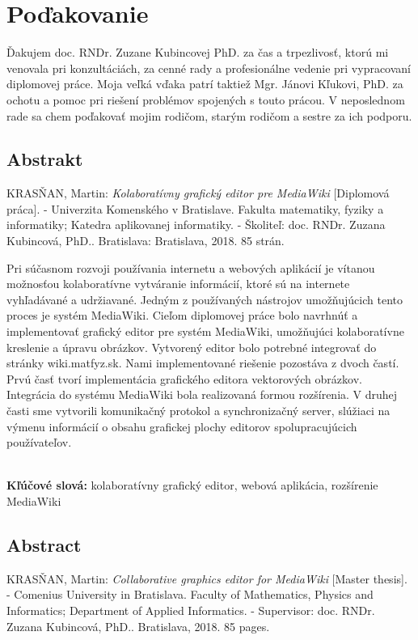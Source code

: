 \documentclass[12pt, a4paper, oneside]{book}
\newcommand\mftitle{Kolaboratívny grafický editor pre MediaWiki}
\newcommand\enmftitle{Collaborative graphics editor for MediaWiki}
\newcommand\mfthesistype{Diplomová práca}
\newcommand\enmfthesistype{Master thesis}
\newcommand\mfadvisor{doc. RNDr. Zuzana Kubincová, PhD.}
\newcommand\mfplacedate{Bratislava, 2018}
\newcommand\mfpracovisko{Katedra aplikovanej informatiky}
\newcommand\enmfpracovisko{Department of Applied Informatics}
\begin{document}
\chapter*{Poďakovanie}\label{chap:thank_you}
Ďakujem doc. RNDr. Zuzane Kubincovej PhD. za čas a trpezlivosť, ktorú mi venovala pri konzultáciách, za cenné rady a profesionálne vedenie pri vypracovaní diplomovej práce. Moja veľká vďaka patrí taktiež Mgr. Jánovi Kľukovi, PhD. za ochotu a pomoc pri riešení problémov spojených s touto prácou. V neposlednom rade sa chem poďakovať mojim rodičom, starým rodičom a sestre za ich podporu. 
\vfill\eject 

\def\spaceafterpar{1em}
\setlength{\parskip}{\spaceafterpar}
\setlength\parindent{0pt}

\section*{Abstrakt}\label{chap:abstract_sk}
\MakeUppercase{Krasňan}, Martin: \textit{\mftitle} [\mfthesistype]. - Univerzita Komenského v Bratislave. Fakulta matematiky, fyziky a informatiky; \mfpracovisko. - Školiteľ: \mfadvisor. Bratislava: \mfplacedate. 85 strán.

Pri súčasnom rozvoji používania internetu a webových aplikácií je vítanou možnosťou kolaboratívne vytváranie informácií, ktoré sú na internete vyhľadávané a udržiavané. Jedným z používaných nástrojov umožňujúcich tento proces je systém MediaWiki.
Cieľom diplomovej práce bolo navrhnúť a implementovať grafický editor pre systém MediaWiki, umožňujúci kolaboratívne kreslenie a úpravu obrázkov. Vytvorený editor bolo potrebné integrovať do stránky wiki.matfyz.sk. Nami implementované riešenie pozostáva z dvoch častí. Prvú časť tvorí implementácia grafického editora vektorových obrázkov. Integrácia do systému MediaWiki bola realizovaná formou rozšírenia. V druhej časti sme vytvorili komunikačný protokol a synchronizačný server, slúžiaci na výmenu informácií o obsahu grafickej plochy editorov spolupracujúcich používateľov. 

~\\
\textbf{Kľúčové slová:} kolaboratívny grafický editor, webová aplikácia, rozšírenie MediaWiki
\vfill\eject 

\section*{Abstract}\label{chap:abstract_en}
\MakeUppercase{Krasňan}, Martin: \textit{\enmftitle} [\enmfthesistype]. - Comenius University in Bratislava. Faculty of Mathematics, Physics and Informatics; \enmfpracovisko. - Supervisor: \mfadvisor. \mfplacedate. 85 pages.
\end{document}
